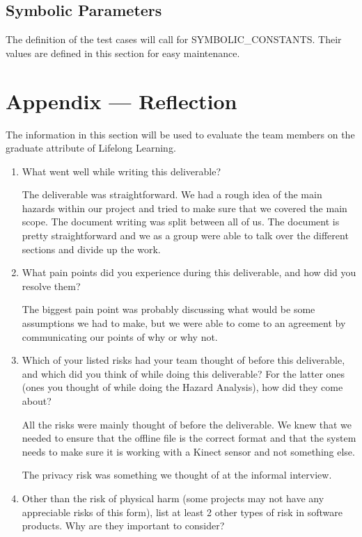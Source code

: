 \documentclass[12pt, titlepage]{article}
\begin{document}
\subsection{Symbolic Parameters}

The definition of the test cases will call for SYMBOLIC\_CONSTANTS.
Their values are defined in this section for easy maintenance.


\newpage{}
\section*{Appendix --- Reflection}

The information in this section will be used to evaluate the team members on the
graduate attribute of Lifelong Learning.

\begin{enumerate}
  

\item What went well while writing this deliverable? 

The deliverable was straightforward. We had a rough idea of the main hazards within our project and 
tried to make sure that we covered the main scope. The document writing was split between all of us.
The document is pretty straightforward and we as a group were able to talk over the different sections
and divide up the work.

\item What pain points did you experience during this deliverable, and how
did you resolve them?

The biggest pain point was probably discussing what would be some assumptions we had to make, but we were able to come to an agreement by communicating our points of why or why not.

\item Which of your listed risks had your team thought of before this
deliverable, and which did you think of while doing this deliverable? For
the latter ones (ones you thought of while doing the Hazard Analysis), how
did they come about?

All the risks were mainly thought of before the deliverable. We knew that we needed to ensure that the 
offline file is the correct format and that the system needs to make sure it is working with a Kinect sensor and not something else.

The privacy risk was something we thought of at the informal interview.

\item Other than the risk of physical harm (some projects may not have any
appreciable risks of this form), list at least 2 other types of risk in
software products. Why are they important to consider?


\end{enumerate}
\end{document}
